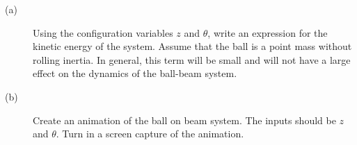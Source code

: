 \begin{description}
\item[(a)] Using the configuration variables $z$ and $\theta$, write an expression for the kinetic energy of the system.  Assume that the ball is a point mass without rolling inertia.  In general, this term will be small and will not have a large effect on the dynamics of the ball-beam system.
\item[(b)] Create an animation of the ball on beam system. The inputs should be $z$ and $\theta$.  Turn in a screen capture of the animation.
\end{description}


